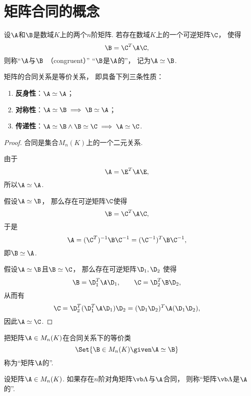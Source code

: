 \section{矩阵合同的概念}
\begin{definition}
设\(\A\)和\(\B\)是数域\(K\)上的两个\(n\)阶矩阵.
若存在数域\(K\)上的一个可逆矩阵\(\C\)，
使得\[
	\B=\C^T\A\C,
\]
则称“\(\A\)与\(\B\)~（congruent）”
“\(\B\)是\(\A\)的”，
记为\(\A\simeq\B\).
\end{definition}

\begin{property}
矩阵的合同关系是等价关系，
即具备下列三条性质：\begin{enumerate}
	\item {\rm\bf 反身性}：\(\A\simeq\A\)；
	\item {\rm\bf 对称性}：\(\A\simeq\B \implies \B\simeq\A\)；
	\item {\rm\bf 传递性}：\(\A\simeq\B \land \B\simeq\C \implies \A\simeq\C\).
\end{enumerate}
\begin{proof}
合同是集合\(M_n(K)\)上的一个二元关系.

由于\[
	\A = \E^T \A \E,
\]
所以\(\A \simeq \A\).

假设\(\A \simeq \B\)，
那么存在可逆矩阵\(\C\)使得\[
	\B=\C^T\A\C,
\]
于是\[
	\A=(\C^T)^{-1}\B\C^{-1}
	=(\C^{-1})^T\B\C^{-1},
\]
即\(\B \simeq \A\).

假设\(\A \simeq \B\)且\(\B \simeq \C\)，
那么存在可逆矩阵\(\D_1,\D_2\)
使得\[
	\B = \D_1^T \A \D_1, \qquad
	\C = \D_2^T \B \D_2,
\]
从而有\[
	\C = \D_2^T (\D_1^T \A \D_1) \D_2
	= (\D_1 \D_2)^T \A (\D_1 \D_2),
\]
因此\(\A \simeq \C\).
\end{proof}
\end{property}

\begin{definition}
把矩阵\(\A \in M_n(K)\)在合同关系下的等价类\[
	\Set{ \B \in M_n(K) \given \A \simeq \B }
\]称为“矩阵\(\A\)的”.
\end{definition}

\begin{definition}
设矩阵\(\A \in M_n(K)\).
如果存在\(n\)阶对角矩阵\(\vb\Lambda\)与\(\A\)合同，
则称“矩阵\(\vb\Lambda\)是\(\A\)的”.
\end{definition}

